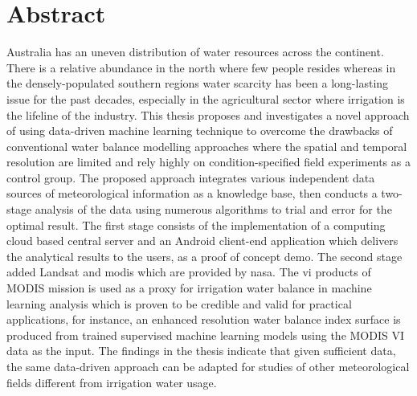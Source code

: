 

\begingroup
\let\clearpage\relax
\let\cleardoublepage\relax
\let\cleardoublepage\relax

\chapter*{Abstract} %

Australia has an uneven distribution of water resources across the continent. There is a relative abundance in the north where few people resides whereas in the densely-populated southern regions water scarcity has been a long-lasting issue for the past decades, especially in the agricultural sector where irrigation is the lifeline of the industry. This thesis proposes and investigates a novel approach of using data-driven machine learning technique to overcome the drawbacks of conventional water balance modelling approaches where the spatial and temporal resolution are limited and rely highly on condition-specified field experiments as a control group. The proposed approach integrates various independent data sources of meteorological information as a knowledge base, then conducts a two-stage analysis of the data using numerous algorithms to trial and error for the optimal result. The first stage consists of the implementation of a computing cloud based central server and an Android client-end application which delivers the analytical results to the users, as a proof of concept demo. The second stage added Landsat and \ac{modis} which are provided by \ac{nasa}. The \ac{vi} products of MODIS mission is used as a proxy for irrigation water balance in machine learning analysis which is proven to be credible and valid for practical applications, for instance, an enhanced resolution water balance index surface is produced from trained supervised machine learning models using the MODIS VI data as the input. The findings in the thesis indicate that given sufficient data, the same data-driven approach can be adapted for studies of other meteorological fields different from irrigation water usage.

\acresetall

\endgroup			

\vfill